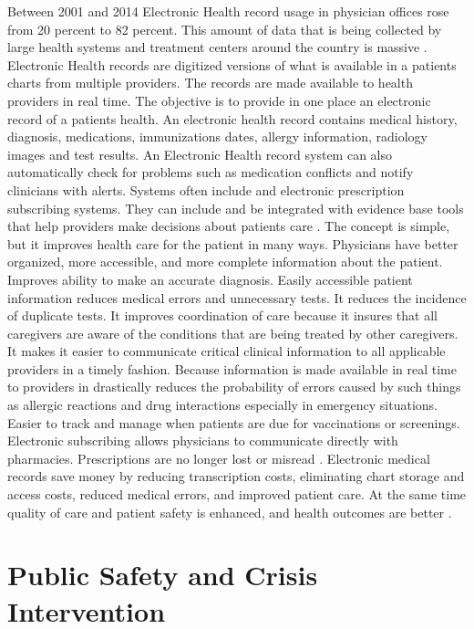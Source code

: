 \documentclass[sigconf]{acmart}
\begin{document}
Between 2001 and 2014 Electronic Health record usage in physician offices rose from 20 percent to 82 percent. This amount of data that is being collected by large health systems and treatment centers around the country is massive \cite{predict}. 
Electronic Health records are digitized versions of what is available in a patients charts from multiple providers. The records are made available to health providers in real time. The objective is to provide in one place an electronic record of a patients health. An electronic health record contains medical history, diagnosis, medications, immunizations dates, allergy information, radiology images and test results.  An Electronic Health record system can also automatically check for problems such as medication conflicts and notify clinicians with alerts. Systems often include and electronic prescription subscribing systems. They can include and be integrated with evidence base tools that help providers make decisions about patients care \cite{elec}.  
The concept is simple, but it improves health care for the patient in many ways. Physicians have better organized, more accessible, and more complete information about the patient.  Improves ability to make an accurate diagnosis.  Easily accessible patient information reduces medical errors and unnecessary tests. It reduces the incidence of duplicate tests. It improves coordination of care because it insures that all caregivers are aware of the conditions that are being treated by other caregivers. It makes it easier to communicate critical clinical information to all applicable providers in a timely fashion. Because information is made available in real time to providers in drastically reduces the probability of errors caused by such things as allergic reactions and drug interactions especially in emergency situations.  Easier to track and manage when patients are due for vaccinations or screenings. Electronic subscribing allows physicians to communicate directly with pharmacies. Prescriptions are no longer lost or misread \cite{elec}.
Electronic medical records save money by reducing transcription costs, eliminating chart storage and access costs, reduced medical errors, and improved patient care. At the same time quality of care and patient safety is enhanced, and health outcomes are better \cite{elec}. 


\section{Public Safety and Crisis Intervention}
\end{document}
